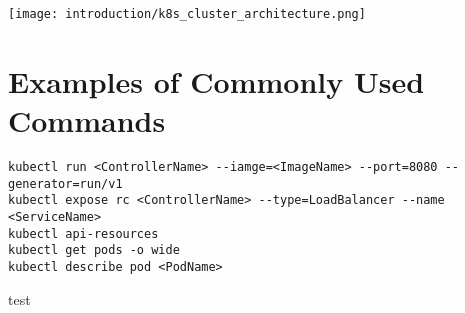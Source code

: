 \texttt{[image: introduction/k8s\_cluster\_architecture.png]}

\section{Examples of Commonly Used Commands}

\begin{lstlisting}[style=bash]
kubectl run <ControllerName> --iamge=<ImageName> --port=8080 --generator=run/v1
kubectl expose rc <ControllerName> --type=LoadBalancer --name <ServiceName>
kubectl api-resources
kubectl get pods -o wide
kubectl describe pod <PodName>
\end{lstlisting}

test
